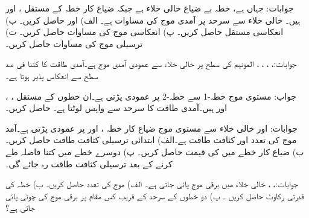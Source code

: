 جوابات: جہاں  ہے، 
خطہ  بے ضیاع خالی خلاء ہے جبکہ ضیاع کار خطہ  کے مستقل ،  اور  ہیں۔ خالی خلاء سے سرحد پر آمدی موج کی مساوات
  ہے۔ الف)  اور  حاصل کریں۔ ب) انعکاسی مستقل حاصل کریں۔ پ) انعکاسی موج  کی مساوات حاصل کریں۔ ت) ترسیلی موج  کی مساوات حاصل کریں۔

جوابات:، ، ،
 ، 
المونیم کی سطح  پر خالی خلاء سے عمودی آمدی موج  ہے۔آمدی طاقت کا کتنا فی صد سطح سے انعکاس پذیر ہوتا ہے۔

جواب:
مستوی موج خطہ-1 سے خطہ-2 پر عمودی پڑتی ہے۔ان خطوں کے مستقل ، ، اور
  ہیں۔آمدی طاقت کا  سرحد سے واپس لوٹتا ہے۔ حاصل کریں۔

جوابات: اور 
خالی خلاء سے مستوی موج ضیاع کار خطہ ،  اور  پر عمودی پڑتی ہے۔آمد موج کی تعدد  اور کثافت طاقت  ہے۔الف) ابتدائی ترسیلی کثافت طاقت حاصل کریں۔ ب) ضیاع کار خطے میں  کی قیمت حاصل کریں۔ پ) دوسرے خطے میں کتنا فاصلہ طے کرنے کے بعد ترسیلی کثافت طاقت  رہ جائے گی۔

جوابات:، ، 
خالی خلاء  میں برقی موج  پائی جاتی ہے۔ الف) موج کی تعدد حاصل کریں۔ ب) خطہ   کی قدرتی رکاوٹ حاصل کریں ۔ پ) دو خطوں کے سرحد کے قریب کس مقام پر برقی موج کی چوٹی پائی جاتی ہے؟


